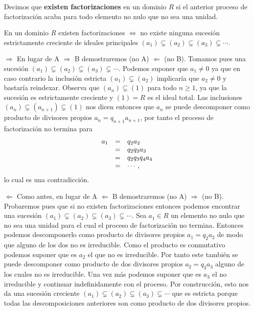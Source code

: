 
Decimos que \textbf{existen factorizaciones} en un dominio \(R\) si el
anterior proceso de factorización acaba para todo elemento no nulo que
no sea una unidad. 


En un dominio \(R\) existen factorizaciones \(\Leftrightarrow\) no
existe ninguna sucesión estrictamente creciente de ideales principales
\((a_1)\subsetneq(a_2)\subsetneq(a_3)\subsetneq\cdots\).


\(\Rightarrow\) En lugar de A \(\Rightarrow\) B demostraremos (no A)
\(\Leftarrow\) (no B). Tomamos pues una sucesión
\((a_1)\subsetneq(a_2)\subsetneq(a_3)\subsetneq\cdots\). Podemos suponer
que \(a_1\neq 0\) ya que en caso contrario la inclusión estricta
\((a_1)\subsetneq(a_2)\) implicaría que \(a_2\neq 0\) y bastaría
reindexar. Observa que \((a_n)\subsetneq (1)\) para todo \(n\geq 1\),
ya que la sucesión es estrictamente creciente y \((1)=R\) es el ideal
total. Las inclusiones \((a_n)\subsetneq (a_{n+1})\subsetneq(1)\) nos
dicen entonces que \(a_n\) se puede descomponer como producto de
divisores propios \(a_n=q_{n+1}a_{n+1}\), por tanto el proceso de
factorización no termina para \[\begin{array}{rcl}
a_1&=& q_2a_2\cr
&=& q_2q_3a_3\cr
&=&q_2q_3q_4a_4\cr
&=&\cdots,
\end{array}\] lo cual es una contradicción.

\(\Leftarrow\) Como antes, en lugar de A \(\Leftarrow\) B demostraremos
(no A) \(\Rightarrow\) (no B). Probaremos pues que si no existen
factorizaciones entonces podemos encontrar una sucesión
\((a_1)\subsetneq(a_2)\subsetneq(a_3)\subsetneq\cdots\). Sea
\(a_1\in R\) un elemento no nulo que no sea una unidad para el cual el
proceso de factorización no termina. Entonces podemos descomponerlo como
producto de divisores propios \(a_1=q_2a_2\) de modo que alguno de
los dos no es irreducible. Como el producto es conmutativo podemos
suponer que es \(a_2\) el que no es irreducible. Por tanto este también
se puede descomponer como producto de dos divisores propios
\(a_2=q_3a_3\) alguno de los cuales no es irreducible. Una vez más
podemos suponer que es \(a_3\) el no irreducible y continuar
indefinidamente con el proceso. Por construcción, esto nos da una
sucesión creciente
\((a_1)\subsetneq(a_2)\subsetneq(a_3)\subsetneq\cdots\) que es estricta
porque todas las descomposiciones anteriores son como producto de dos
divisores propios. 

